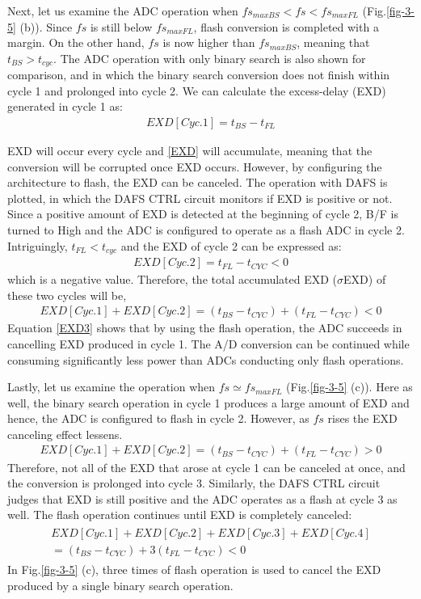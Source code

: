 Next, let us examine the ADC operation when $fs_{maxBS} < fs < fs_{maxFL}$ (Fig.\ref{fig-3-5} (b)).  Since $fs$ is still below $fs_{maxFL}$, flash conversion is completed with a margin. On the other hand, $fs$ is now higher than $fs_{maxBS}$, meaning that $t_{BS} > t_{cyc}$. The ADC operation with only binary search is also shown for comparison, and in which the binary search conversion does not finish within cycle 1 and prolonged into cycle 2. We can calculate the excess-delay (EXD) generated in cycle 1 as:
\begin{eqnarray}
  EXD[Cyc.1] = t_{BS} - t_{FL}
  \label{EXD}
\end{eqnarray}

EXD will occur every cycle and \eqref{EXD} will accumulate, meaning that the conversion will be corrupted once EXD occurs. However, by configuring the architecture to flash, the EXD can be canceled. The operation with DAFS is plotted, in which the DAFS CTRL circuit monitors if EXD is positive or not. Since a positive amount of EXD is detected at the beginning of cycle 2, B/F is turned to High and the ADC is configured to operate as a flash ADC in cycle 2. Intriguingly, $t_{FL} < t_{cyc}$ and the EXD of cycle 2 can be expressed as:
\begin{eqnarray}
  EXD[Cyc.2] = t_{FL} - t_{CYC} < 0
  \label{EXD2}
\end{eqnarray}
which is a negative value. Therefore, the total accumulated EXD ($\sigma$EXD) of these two cycles will be,
\begin{eqnarray}
  EXD[Cyc.1] + EXD[Cyc.2] = (t_{BS} - t_{CYC}) + (t_{FL} - t_{CYC}) < 0
  \label{EXD3}
\end{eqnarray}
Equation \eqref{EXD3} shows that by using the flash operation, the ADC succeeds in cancelling EXD produced in cycle 1. The A/D conversion can be continued while consuming significantly less power than ADCs conducting only flash operations.

Lastly, let us examine the operation when $fs \simeq fs_{maxFL}$  (Fig.\ref{fig-3-5} (c)). Here as well, the binary search operation in cycle 1 produces a large amount of EXD and hence, the ADC is configured to flash in cycle 2. However, as $fs$ rises the EXD canceling effect lessens.
\begin{eqnarray}
  EXD[Cyc.1] + EXD[Cyc.2] = (t_{BS} - t_{CYC}) + (t_{FL} - t_{CYC}) > 0
  \label{EXD5}
\end{eqnarray}
Therefore, not all of the EXD that arose at cycle 1 can be canceled at once, and the conversion is prolonged into cycle 3. Similarly, the DAFS CTRL circuit judges that EXD is still positive and the ADC operates as a flash at cycle 3 as well. The flash operation continues until EXD is completely canceled:
\begin{eqnarray}
\begin{split}
  EXD[Cyc.1] + EXD[Cyc.2] + EXD[Cyc.3] + EXD[Cyc.4] \\
  = (t_{BS} - t_{CYC}) + 3(t_{FL} - t_{CYC}) < 0
  \label{EXD4}
  \end{split}
\end{eqnarray}
In Fig.\ref{fig-3-5} (c), three times of flash operation is used to cancel the EXD produced by a single binary search operation. 

